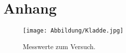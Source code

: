 \section{Anhang}\label{sec:Anhang}
\begin{figure}[h]
   \centering
    \texttt{[image: Abbildung/Kladde.jpg]}
   \caption{Messwerte zum Versuch.}
\end{figure}
\pagebreak